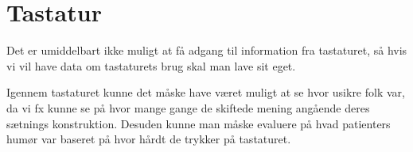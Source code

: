 \section{Tastatur}
Det er umiddelbart ikke muligt at få adgang til information fra tastaturet, så hvis vi vil have data om tastaturets brug skal man lave sit eget.

Igennem tastaturet kunne det måske have været muligt at se hvor usikre folk var, da vi fx kunne se på hvor mange gange de skiftede mening angående deres sætnings konstruktion.
Desuden kunne man måske evaluere på hvad patienters humør var baseret på hvor hårdt de trykker på tastaturet.

\begin{comment}
Idéer til tastatur:
\begin{description}[style=nextline]
\item[Antal Rettelser]
\item[Ordbrug]
\item[Tid for en sætning]
\item[Tryk niveau]
\end{description}

Sensor
\begin{description}[style=nextline]
\item[Kan vi få fat i data?] Lyder som om det ikke er muligt at keylogge globalt. Man kan lave sit eget tastatur som erstatter default tastatur og keylogge derfra, men det lyder ikke til at det er muligt at lave en Service keylogger som får fat i alt som bliver skrevet på devicet.
\item[Er der begrænsninger?] Det lyder til at man bliver nødt til at lave sit eget tastatur.
\item[Hvilke data giver sensoren?] N/A
\end{description}

Da vi ikke tror det er praktisk kan denne nok blive udelukket som en mulighed og vi vil derfor ikke forsætte med analysen.

Analyse
\begin{description}[style=nextline]
\item[Har vi data nok?]
\item[Hvilke data skal benyttes?]
\item[Formål med analysen]
\item[Ide til visualisering (?)]
\item[(kort oprids af fremgangsmåde)]
\item[(gem illustrationer og kilder)]
\end{description}
\end{comment}




